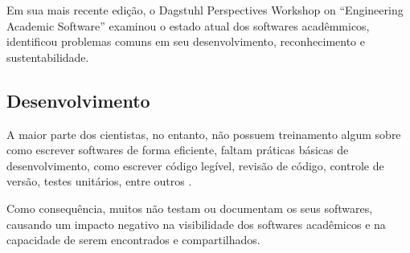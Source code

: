 Em sua mais recente edição, o Dagstuhl Perspectives Workshop on ``Engineering
Academic Software'' \cite{allen2017engineering} examinou o estado atual dos
softwares acadêmmicos, identificou problemas comuns em seu desenvolvimento,
reconhecimento e sustentabilidade.

%
%
%

\subsection{Desenvolvimento}

A maior parte dos cientistas, no entanto, não possuem treinamento algum sobre
como escrever softwares de forma eficiente, faltam práticas básicas de
desenvolvimento, como escrever código legível, revisão de código, controle de
versão, testes unitários, entre outros \cite{wilson2017good}.

%

Como consequência, muitos não testam ou documentam os seus softwares, causando
um impacto negativo na visibilidade dos softwares acadêmicos \cite{howison2013,
katz2014transitive} e na capacidade de serem encontrados e compartilhados.

